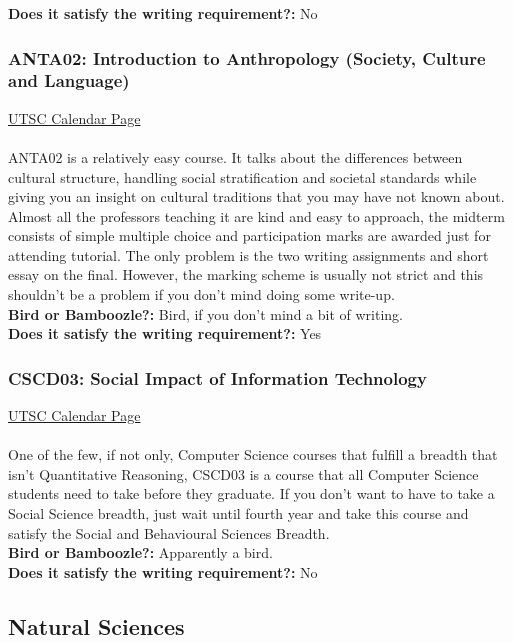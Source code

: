 \documentclass[11pt]{article}
\begin{document}
\textbf{Does it satisfy the writing requirement?:} No

\subsubsection{ANTA02: Introduction to Anthropology 
(Society, Culture and Language)}
\href{https://utsc.calendar.utoronto.ca/course/ANTA02H3}{UTSC Calendar Page}\\\\
ANTA02 is a relatively easy course. It talks about the differences
between cultural structure, handling social stratification and societal
standards while giving you an insight on cultural traditions that you
may have not known about. Almost all the professors teaching it are kind
and easy to approach, the midterm consists of simple multiple choice and
participation marks are awarded just for attending tutorial. The only
problem is the two writing assignments and short essay on the final.
However, the marking scheme is usually not strict and this shouldn't be
a problem if you don't mind doing some write-up.\\

\textbf{Bird or Bamboozle?:} Bird, if you don't mind a bit of writing.\\

\textbf{Does it satisfy the writing requirement?:} Yes


\subsubsection{CSCD03: Social Impact of Information Technology}
\href{https://utsc.calendar.utoronto.ca/course/CSCD03H3}{UTSC Calendar Page}\\\\
One of the few, if not only, Computer Science courses that fulfill a
breadth that isn't Quantitative Reasoning, CSCD03 is a course that all
Computer Science students need to take before they graduate. If you
don't want to have to take a Social Science breadth, just wait until
fourth year and take this course and satisfy the Social and Behavioural
Sciences Breadth.\\

\textbf{Bird or Bamboozle?:} Apparently a bird.\\

\textbf{Does it satisfy the writing requirement?:} No

\subsection{Natural Sciences}
\end{document}

